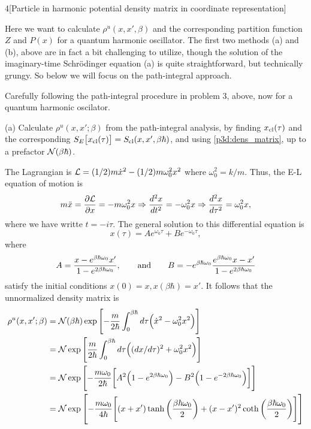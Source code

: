 \documentclass[12pt]{article}
\begin{document}
\newpage
\begin{problem}{4}[Particle in harmonic potential density matrix in coordinate
    representation]

Here we want to calculate $\rho^u(x,x',\beta)$ and the corresponding partition
function $Z$ and $P(x)$ for a quantum harmonic oscillator. The first two methods
(a) and (b), above are in fact a bit challenging to utilize, though the solution
of the imaginary-time Schr\"{o}dinger equation (a) is quite straightforward, but
technically grungy. So below we will focus on the path-integral approach.

Carefully following the path-integral procedure in problem 3, above, now for a
quantum harmonic oscilator.

(a) Calculate $\rho^u(x,x';\beta)$ from the path-integral analysis, by finding
$x_{\text{cl}}(\tau)$ and the corresponding
$S_E\qty[x_{\text{cl}}(\tau)]=S_{\text{cl}}(x,x',\beta\hbar)$, and using
\eqref{p3d:dens_matrix}, up to a prefactor $\mathcal{N}(\beta\hbar)$.
\begin{solution}
The Lagrangian is $\mathcal{L}=(1/2)m\dot{x}^2-(1/2)m\omega_0^2x^2$ where
$\omega_0^2=k/m$. Thus, the E-L equation of motion is
\begin{equation}
    m\ddot{x}=\frac{\partial\mathcal{L}}{\partial x}
    =-m\omega_0^2x\Rightarrow\frac{d^2x}{dt^2}=-\omega_0^2x
    \Rightarrow\frac{d^2x}{d\tau^2}=\omega_0^2x,
\end{equation}
where we have writte $t=-i\tau$. The general solution to this differential
equation is
\begin{equation}
    x(\tau)=Ae^{\omega_0\tau}+Be^{-\omega_0\tau}, 
\end{equation}
where
\begin{equation}
    A=\frac{x-e^{\beta\hbar\omega_0}x'}{1-e^{2\beta\hbar\omega_0}},\qquad\text{and}
    \qquad
    B=-e^{\beta\hbar\omega_0}\frac{e^{\beta\hbar\omega_0}x-x'}{1-e^{2\beta\hbar\omega_0}}
\end{equation}
satisfy the initial conditions $x(0)=x,x(\beta\hbar)=x'$. It follows that the
unnormalized density matrix is
\begin{align}
    \rho^u(x,x';\beta)
    &=\mathcal{N}(\beta\hbar)\exp\qty[-\frac{m}{2\hbar}\int_0^{\beta\hbar}d\tau\qty(\dot{x}^2-\omega_0^2x^2)]\notag\\
    &=\mathcal{N}\exp\qty[\frac{m}{2\hbar}\int_0^{\beta\hbar}d\tau
    \qty((dx/d\tau)^2+\omega_0^2x^2)]\notag\\
    &=\mathcal{N}\exp\qty[-\frac{m\omega_0}{2\hbar}
        \qty[A^2\qty(1-e^{2\beta\hbar\omega_0})-B^2\qty(1-e^{-2\beta\hbar\omega_0})]]\notag\\
    &=\mathcal{N}\exp\qty[-\frac{m\omega_0}{4\hbar}\qty[(x+x')\tanh\qty(\frac{\beta\hbar\omega_0}{2})+(x-x')^2\coth\qty(\frac{\beta\hbar\omega_0}{2})]]
\end{align}
\end{solution}


\end{problem}
\end{document}
